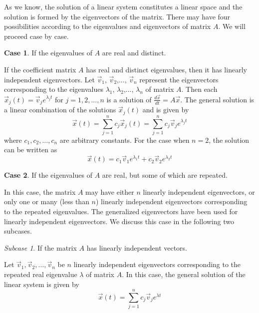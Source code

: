 \documentclass[11pt]{book}
\theoremstyle{definition}\newtheorem{definition}[subsection]{Definition}
\theoremstyle{definition}\newtheorem{example}[subsection]{Example}
\theoremstyle{definition}\newtheorem{notation}[subsection]{Notation}
\theoremstyle{definition}\newtheorem{remark}[subsection]{Remark}
\theoremstyle{theorem}\newtheorem{theorem}[subsection]{Theorem}
\theoremstyle{theorem}\newtheorem{lemma}[subsection]{Lemma}
\theoremstyle{theorem}\newtheorem{proposition}[subsection]{Proposition}
\theoremstyle{theorem}\newtheorem{corollary}[subsection]{Corollary}
\theoremstyle{theorem}\newtheorem{case}{Case}
\theoremstyle{remark}\newtheorem{subcase}{Subcase}[case]
\begin{document}
As we know, the solution of a linear system constitutes a linear space and the solution is formed by the eigenvectors of the matrix. There may have four possibilities according to the eigenvalues and eigenvectors of matrix $A$. We will proceed case by case.  

\begin{case}
    If the eigenvalues of $A$ are real and distinct.
\end{case}

If the coefficient matrix $A$ has real and distinct eigenvalues, then it has linearly independent eigenvectors. Let $\vec{v}_1$, $\vec{v}_2$,..., $\vec{v}_n$ represent the eigenvectors corresponding to the eigenvalues $\lambda_1$, $\lambda_2$,..., $\lambda_n$ of matrix $A$. Then each $\vec{x}_j(t) = \vec{v}_je^{\lambda_j t}$ for $j = 1, 2,..., n$ is a solution of $\frac{d\vec{x}}{dt} = A\vec{x}$. The general solution is a linear combination of the solutions $\vec{x}_j(t)$ and is given by
\begin{equation*}
    \vec{x}(t) = \sum_{j = 1}^{n} c_j\vec{x}_j(t) = \sum_{j = 1}^{n} c_j \vec{v}_je^{\lambda_j t}
\end{equation*}
where $c_1, c_2,..., c_n$ are arbitrary constants. For the case when $n = 2$, the solution can be written as
\begin{equation*}
    \vec{x}(t) = c_1\vec{v}_1e^{\lambda_1 t} + c_2\vec{v}_2e^{\lambda_2 t}
\end{equation*}

\begin{case}
    If the eigenvalues of $A$ are real, but some of which are repeated.
\end{case}

In this case, the matrix $A$ may have either $n$ linearly independent eigenvectors, or only one or many (less than $n$) linearly independent eigenvectors corresponding to the repeated eigenvalues. The generalized eigenvectors have been used for linearly independent eigenvectors. We discuss this case in the following two subcases.

\begin{subcase}
    If the matrix $A$ has linearly independent vectors.
\end{subcase}

Let $\vec{v}_1, \vec{v}_2,..., \vec{v}_n$ be $n$ linearly independent eigenvectors corresponding to the repeated real eigenvalue $\lambda$ of matrix $A$. In this case, the general solution of the linear system is given by
\begin{equation*}
    \vec{x}(t) = \sum_{j = 1}^{n} c_j\vec{v}_je^{\lambda t}
\end{equation*}
\end{document}
